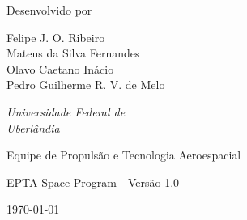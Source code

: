 \begin{titlepage}
\begin{minipage}[h!]{0.6\textwidth}
		\vspace*{3\baselineskip} %
	
	
		Desenvolvido por
	
		\vspace{0.8\baselineskip} %
		
        {
        Felipe J. O. Ribeiro \\ 
        Mateus da Silva Fernandes \\ 
        Olavo Caetano Inácio \\
        Pedro Guilherme R. V. de Melo
        } %
        
		
        \vspace{0.8\baselineskip} %
	
		\textit{Universidade Federal de \\ Uberlândia} %
	
		\vspace{12.8\baselineskip} %
	
		{\large Equipe de Propulsão e Tecnologia Aeroespacial} %
		
		\vspace{0.3\baselineskip} %
		
		EPTA Space Program - Versão 1.0 %
		
		\vspace{0.3\baselineskip} %
		
		\today %
		
	\end{minipage}



\end{titlepage}


